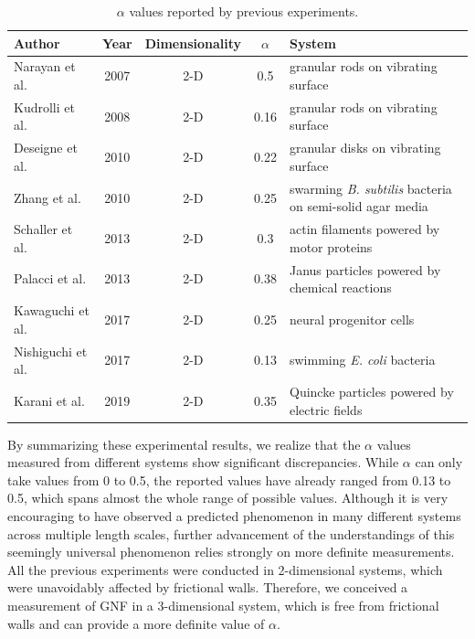 \begin{table}[h]
	\centering
	\begin{tabular}{  lccc m{2in} }
		\toprule
		Author              & Year & Dimensionality & $\alpha$ & System \\\midrule
		Narayan et al.      & 2007 & 2-D            &  0.5     & granular rods on vibrating surface \\
		Kudrolli et al.     & 2008 & 2-D            &  0.16    & granular rods on vibrating surface \\
		Deseigne et al.     & 2010 & 2-D            &  0.22    & granular disks on vibrating surface \\
		Zhang et al.        & 2010 & 2-D            &  0.25    & swarming \textit{B. subtilis} bacteria on semi-solid agar media \\
		Schaller et al.     & 2013 & 2-D            &  0.3     & actin filaments powered by motor proteins \\
		Palacci et al.      & 2013 & 2-D            &  0.38    & Janus particles powered by chemical reactions \\
		Kawaguchi et al.    & 2017 & 2-D            &  0.25    & neural progenitor cells \\
		Nishiguchi et al.   & 2017 & 2-D            &  0.13    & swimming \textit{E. coli} bacteria \\
		Karani et al.       & 2019 & 2-D            &  0.35    & Quincke particles powered by electric fields \\
		\bottomrule
	\end{tabular}
	\caption{$\alpha$ values reported by previous experiments.}
	\label{table:alpha-values}
\end{table}

By summarizing these experimental results, we realize that the $\alpha$ values measured from different systems show significant discrepancies. While $\alpha$ can only take values from 0 to 0.5, the reported values have already ranged from 0.13 to 0.5, which spans almost the whole range of possible values.
Although it is very encouraging to have observed a predicted phenomenon in many different systems across multiple length scales, further advancement of the understandings of this seemingly universal phenomenon relies strongly on more definite measurements. All the previous experiments were conducted in 2-dimensional systems, which were unavoidably affected by frictional walls. Therefore, we conceived a measurement of GNF in a 3-dimensional system, which is free from frictional walls and can provide a more definite value of $\alpha$.

